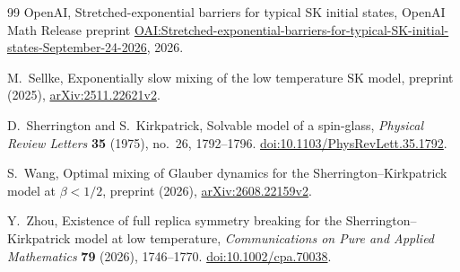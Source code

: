 \begin{thebibliography}{99}
OpenAI,
\newblock Stretched-exponential barriers for typical SK initial states,
\newblock OpenAI Math Release preprint
\href{https://github.com/openai/math/blob/main/preprints/Stretched-exponential-barriers-for-typical-SK-initial-states-September-24-2026/paper.pdf}{OAI:Stretched-exponential-barriers-for-typical-SK-initial-states-September-24-2026},
2026.

M.~Sellke,
\newblock Exponentially slow mixing of the low temperature SK model,
\newblock preprint (2025),
\href{https://arxiv.org/abs/2511.22621v2}{arXiv:2511.22621v2}.

D.~Sherrington and S.~Kirkpatrick,
\newblock Solvable model of a spin-glass,
\newblock \emph{Physical Review Letters}
\textbf{35} (1975), no.~26, 1792--1796.
\newblock \href{https://doi.org/10.1103/PhysRevLett.35.1792}{doi:10.1103/PhysRevLett.35.1792}.

S.~Wang,
\newblock Optimal mixing of Glauber dynamics for the
Sherrington--Kirkpatrick model at $\beta<1/2$,
\newblock preprint (2026),
\href{https://arxiv.org/abs/2608.22159v2}{arXiv:2608.22159v2}.

Y.~Zhou,
\newblock Existence of full replica symmetry breaking for the
Sherrington--Kirkpatrick model at low temperature,
\newblock \emph{Communications on Pure and Applied Mathematics}
\textbf{79} (2026), 1746--1770.
\newblock \href{https://doi.org/10.1002/cpa.70038}{doi:10.1002/cpa.70038}.

\end{thebibliography}
